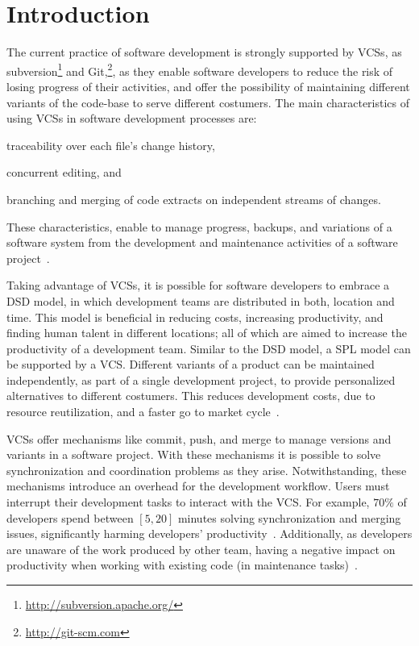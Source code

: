 
\section{Introduction}
\label{sec:introduction}

The current practice of software development is strongly supported by \acp{VCS}, as subversion\footnote{\url{http://subversion.apache.org/}} and Git,\footnote{\url{http://git-scm.com}}, as they enable software developers to reduce the risk of losing progress of their activities, and offer the possibility of maintaining different variants of the code-base to serve different costumers.
The main characteristics of using \acp{VCS} in software development processes are:
\begin{enumerate*}[label=(\arabic*)]
\item traceability over each file's change history, 
\item concurrent editing, and 
\item branching and merging of code extracts on independent streams of changes. 
\end{enumerate*}
These characteristics, enable to manage progress, backups, and variations of a software system from the development and maintenance activities of a software project~\cite{spinellis05}.

Taking advantage of \acp{VCS},  it is possible for software developers to embrace a \ac{DSD} model, in which development teams are distributed in both, location and time. This model is beneficial in reducing costs, increasing productivity, and finding human talent in different locations; all of which are aimed to increase the productivity of a development team. 
Similar to the \ac{DSD} model, a \ac{SPL} model can be supported by a \ac{VCS}. Different variants of a product can be maintained independently, as part of a single development project, to provide personalized alternatives to different costumers. This reduces development costs, due to resource reutilization, and a faster go to market cycle~\cite{klaus10}.  

\acp{VCS} offer mechanisms like commit, push, and merge to manage versions and variants in a software project. With these mechanisms it is possible to solve synchronization and coordination problems as they arise. 
Notwithstanding, these mechanisms introduce an overhead for the development workflow. Users must interrupt their development tasks to interact with the \ac{VCS}. For example, $70\%$ of developers spend between $[5, 20]$ minutes solving synchronization and merging issues, significantly harming developers' productivity~\cite{estler}. Additionally, as developers are unaware of the work produced by other team, having a negative impact on productivity when working with existing code (\eg in maintenance tasks)~\cite{[4]}.

